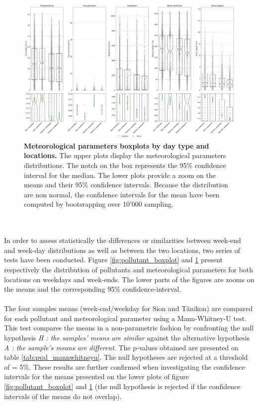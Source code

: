 \documentclass[a4paper, 12pt]{article}
\begin{document}
    \begin{figure}[t!]
        \centering
        \includegraphics[width = 1 \textwidth]{Figures/boxplots_meteo.png}
        \caption{\textbf{Meteorological parameters boxplots by day type and locations.} The upper plots display the meteorological parameters distributions. The notch on the box represents the 95\% confidence interval for the median. The lower plots provide a zoom on the means and their 95\% confidence intervals. Because the distribution are non normal, the confidence intervals for the mean have been computed by bootsrapping over 10'000 sampling.}
        \label{fig:meteo_boxplot}
    \end{figure}
    \\
    \\
    In order to assess statistically the differences or similarities between week-end and week-day distributions as well as between the two locations, two series of tests have been conducted. Figure \ref{fig:pollutant_boxplot} and \ref{fig:meteo_boxplot} present respectively the distribution of pollutants and meteorological parameters for both locations on weekdays and week-ends. The lower parts of the figures are zooms on the means and the corresponding 95\% confidence-interval. \\
    \\
    The four samples means (week-end/weekday for Sion and Tänikon) are compared for each pollutant and meteorological parameter using a Mann-Whitney-U test. This test compares the means in a non-parametric fashion by confronting the null hypothesis \textit{H : the samples' means are similar} against the alternative hypothesis \textit{A : the sample's means are different}. The p-values obtained are presented on table \ref{tab:pval_mannwhitneyu}. The null hypotheses are rejected at a threshold of \textalpha = 5\%. These results are further confirmed when investigating the confidence intervals for the means presented on the lower plots of figure \ref{fig:pollutant_boxplot} and \ref{fig:meteo_boxplot} (the null hypothesis is rejected if the confidence intervals of the means do not overlap). 
\end{document}
